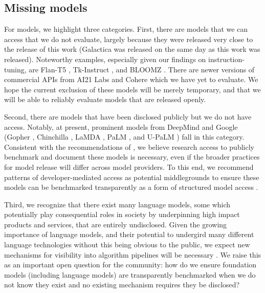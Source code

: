 \subsection{Missing models}
\label{sec:missing-models}

For models, we highlight three categories.
First, there are models that we can access that we do not evaluate, largely because they were released very close to the release of this work (\eg Galactica \citep{taylor2022galactica} was released on the same day as this work was released).
Noteworthy examples, especially given our findings on instruction-tuning, are Flan-T5 \citep{chung2022scaling}, Tk-Instruct \citep{wang2022supernatural}, and BLOOMZ \citep{muennighoff2022crosslingual}.
There are newer versions of commercial APIs from AI21 Labs and Cohere which we have yet to evaluate.
We hope the current exclusion of these models will be merely temporary, and that we will be able to reliably evaluate models that are released openly. 

Second, there are models that have been disclosed publicly but we do not have access.
Notably, at present, prominent models from DeepMind and Google (\eg Gopher \citep{rae2021gopher}, Chinchilla \citep{hoffmann2022chinchilla}, LaMDA \citep{thoppilan2022lamda}, PaLM \citep{chowdhery2022palm}, and U-PaLM \citep{tay2022transcending}) fall in this category.
Consistent with the recommendations of \citet{liang2022community-norms}, we believe research access to publicly benchmark and document these models is necessary, even if the broader practices for model release will differ across model providers.
To this end, we recommend patterns of developer-mediated access as potential middlegrounds to ensure these models can be benchmarked transparently as a form of structured model access \citep{shevlane2022structured}. 

Third, we recognize that there exist many language models, some which potentially play consequential roles in society by underpinning high impact products and services, that are entirely undisclosed.
Given the growing importance of language models, and their potential to undergird many different language technologies without this being obvious to the public, we expect new mechanisms for visibility into algorithm pipelines will be necessary \citep[see][]{bommasani2022homogenization}.
We raise this as an important open question for the community: how do we ensure foundation models (including language models) are transparently benchmarked when we do not know they exist and no existing mechanism requires they be disclosed?


